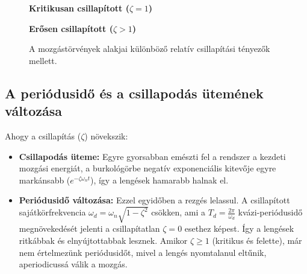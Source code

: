 \begin{figure}[H]
    \vspace{0.5cm}
    \begin{minipage}{0.48\textwidth}
        \centering
        \textbf{Kritikusan csillapított ($\zeta = 1$)} \\
    \end{minipage}\hfill
    \begin{minipage}{0.48\textwidth}
        \centering
        \textbf{Erősen csillapított ($\zeta > 1$)} \\
    \end{minipage}
    \caption{A mozgástörvények alakjai különböző relatív csillapítási tényezők mellett.}
\end{figure}

\newpage
\subsection*{A periódusidő és a csillapodás ütemének változása}
Ahogy a csillapítás ($\zeta$) növekszik:
\begin{itemize}
    \item \textbf{Csillapodás üteme:} Egyre gyorsabban emészti fel a rendszer a kezdeti mozgási energiát, a burkológörbe negatív exponenciális kitevője egyre markánsabb ($e^{-\zeta\omega_n t}$), így a lengések hamarabb halnak el.
    \item \textbf{Periódusidő változása:} Ezzel egyidőben a rezgés lelassul. A csillapított sajátkörfrekvencia $\omega_d = \omega_n \sqrt{1-\zeta^2}$ csökken, ami a $T_d = \frac{2\pi}{\omega_d}$ kvázi-periódusidő megnövekedését jelenti a csillapítatlan $\zeta=0$ esethez képest. Így a lengések ritkábbak és elnyújtottabbak lesznek. Amikor $\zeta \ge 1$ (kritikus és felette), már nem értelmezünk periódusidőt, mivel a lengés nyomtalanul eltűnik, aperiodicussá válik a mozgás.
\end{itemize}

